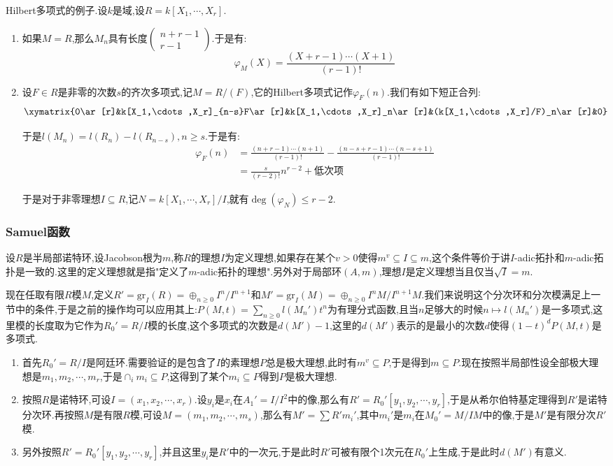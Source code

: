 Hilbert多项式的例子.设$k$是域,设$R=k[X_1,\cdots,X_r]$.
\begin{enumerate}
	\item 如果$M=R$,那么$M_n$具有长度$\left(\begin{array}{c}n+r-1\\r-1\end{array}\right)$.于是有:
	$$\varphi_M(X)=\frac{(X+r-1)\cdots(X+1)}{(r-1)!}$$
	\item 设$F\in R$是非零的次数$s$的齐次多项式,记$M=R/(F)$,它的Hilbert多项式记作$\varphi_F(n)$.我们有如下短正合列:
	$$\xymatrix{0\ar[r]&k[X_1,\cdots,X_r]_{n-s}F\ar[r]&k[X_1,\cdots,X_r]_n\ar[r]&(k[X_1,\cdots,X_r]/F)_n\ar[r]&0}$$
	
	于是$l(M_n)=l(R_n)-l(R_{n-s}),n\ge s$.于是有:
	\begin{align*}
		\varphi_F(n)&=\frac{(n+r-1)\cdots(n+1)}{(r-1)!}-\frac{(n-s+r-1)\cdots(n-s+1)}{(r-1)!}\\&=\frac{s}{(r-2)!}n^{r-2}+\text{低次项}
	\end{align*}

    于是对于非零理想$I\subseteq R$,记$N=k[X_1,\cdots,X_r]/I$,就有$\deg(\varphi_N)\le r-2$.
\end{enumerate}
\subsubsection{Samuel函数}

设$R$是半局部诺特环,设Jacobson根为$m$,称$R$的理想$I$为定义理想,如果存在某个$v>0$使得$m^v\subseteq I\subseteq m$,这个条件等价于讲$I$-adic拓扑和$m$-adic拓扑是一致的.这里的定义理想就是指"定义了$m$-adic拓扑的理想".另外对于局部环$(A,m)$,理想$I$是定义理想当且仅当$\sqrt{I}=m$.

现在任取有限$R$模$M$,定义$R'=\mathrm{gr}_I(R)=\oplus_{n\ge0}I^n/I^{n+1}$和$M'=\mathrm{gr}_I(M)=\oplus_{n\ge0}I^nM/I^{n+1}M$.我们来说明这个分次环和分次模满足上一节中的条件,于是之前的操作均可以应用其上:$P(M,t)=\sum_{n\ge0}l(M_n')t^n$为有理分式函数,且当$n$足够大的时候$n\mapsto l(M_n')$是一多项式,这里模的长度取为它作为$R_0'=R/I$模的长度,这个多项式的次数是$d(M')-1$,这里的$d(M')$表示的是最小的次数$d$使得$(1-t)^dP(M,t)$是多项式.
\begin{enumerate}
	\item 首先$R_0'=R/I$是阿廷环.需要验证的是包含了$I$的素理想$P$总是极大理想,此时有$m^v\subseteq P$,于是得到$m\subseteq P$.现在按照半局部性设全部极大理想是$m_1,m_2,\cdots,m_r$,于是$\cap_im_i\subseteq P$,这得到了某个$m_i\subseteq P$得到$P$是极大理想.
	\item 按照$R$是诺特环,可设$I=(x_1,x_2,\cdots,x_r)$.设$y_i$是$x_i$在$A_1'=I/I^2$中的像,那么有$R'=R_0'[y_1,y_2,\cdots,y_r]$,于是从希尔伯特基定理得到$R'$是诺特分次环.再按照$M$是有限$R$模,可设$M=(m_1,m_2,\cdots,m_s)$,那么有$M'=\sum R'm_i'$,其中$m_i'$是$m_i$在$M_0'=M/IM$中的像,于是$M'$是有限分次$R'$模.
	\item 另外按照$R'=R_0'[y_1,y_2,\cdots,y_r]$,并且这里$y_i$是$R'$中的一次元,于是此时$R'$可被有限个1次元在$R_0'$上生成,于是此时$d(M')$有意义.
\end{enumerate}

